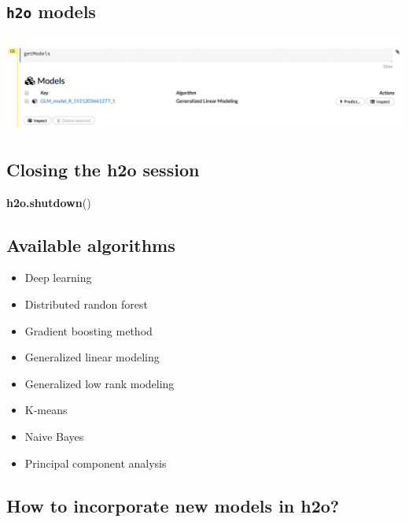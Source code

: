 \documentclass[]{book}
\newenvironment{Shaded}{\begin{snugshade}}{\end{snugshade}}
\newcommand{\KeywordTok}[1]{\textcolor[rgb]{0.13,0.29,0.53}{\textbf{#1}}}
\newcommand{\NormalTok}[1]{#1}
\providecommand{\tightlist}{%
  \setlength{\itemsep}{0pt}\setlength{\parskip}{0pt}}
\theoremstyle{definition}
\theoremstyle{definition}
\theoremstyle{definition}
\theoremstyle{remark}
\begin{document}
\subsection{\texorpdfstring{\texttt{h2o}
models}{h2o models}}\label{h2o-models}

\begin{center}\includegraphics[width=27.51in]{images/ch6_h2o_models} \end{center}

\subsection{Closing the h2o session}\label{closing-the-h2o-session}

\begin{Shaded}
\begin{Highlighting}[]
\KeywordTok{h2o.shutdown}\NormalTok{()}
\end{Highlighting}
\end{Shaded}

\subsection{Available algorithms}\label{available-algorithms}

\begin{itemize}
\tightlist
\item
  Deep learning
\item
  Distributed randon forest
\item
  Gradient boosting method
\item
  Generalized linear modeling
\item
  Generalized low rank modeling
\item
  K-means
\item
  Naive Bayes
\item
  Principal component analysis
\end{itemize}

\subsection{How to incorporate new models in
h2o?}\label{how-to-incorporate-new-models-in-h2o}
\end{document}
